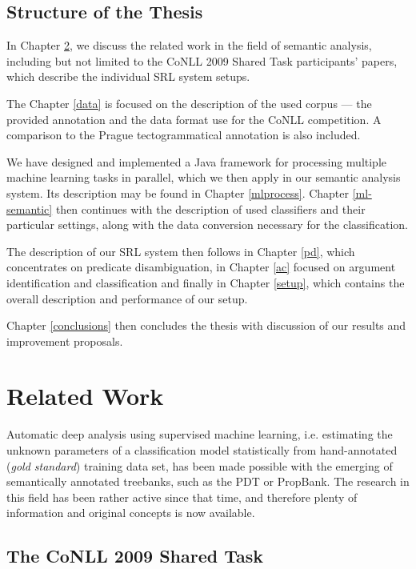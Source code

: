 \documentclass[12pt,notitlepage]{report}
\begin{document}
\section{Structure of the Thesis}

In Chapter \ref{related}, we discuss the related work in the field of semantic analysis, including but not limited to the CoNLL 2009 Shared Task participants' papers, which describe the individual SRL system setups.

The Chapter \ref{data} is focused on the description of the used corpus --- the provided annotation and the data format use for the CoNLL competition. A comparison to the Prague tectogrammatical annotation \citep{cinkova09} is also included.

We have designed and implemented a Java framework for processing multiple machine learning tasks in parallel, which we then apply in our semantic analysis system. Its description may be found in Chapter \ref{mlprocess}. Chapter \ref{ml-semantic} then continues with the description of used classifiers and their particular settings, along with the data conversion necessary for the classification.

The description of our SRL system then follows in Chapter \ref{pd}, which concentrates on predicate disambiguation, in Chapter \ref{ac} focused on argument identification and classification and finally in Chapter \ref{setup}, which contains the overall description and performance of our setup.

Chapter \ref{conclusions} then concludes the thesis with discussion of our results and improvement proposals.

%
%
\chapter{Related Work}\label{related}
%
%

Automatic deep analysis using supervised machine learning, i.e. estimating the unknown parameters of a classification model statistically from hand-annotated (\emph{gold standard}) training data set, has been made possible with the emerging of semantically annotated treebanks, such as the PDT or PropBank. The research in this field has been rather active since that time, and therefore plenty of information and original concepts is now available. 

\section{The CoNLL 2009 Shared Task}\label{conll2009}
\end{document}
